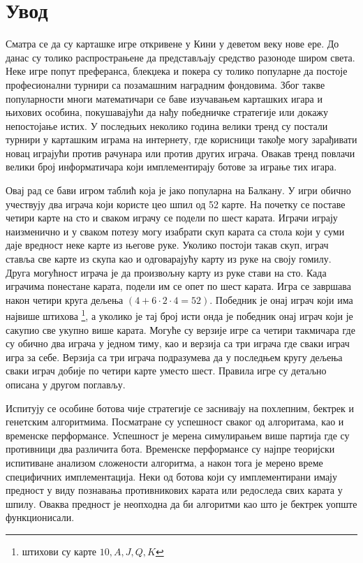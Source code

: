\documentclass[a4paper, 12pt, ngerman]{article}
\let\oldsection\section
\renewcommand\section{\clearpage\oldsection}
\begin{document}
\pagebreak
\tableofcontents
\pagebreak

\section{Увод}
Сматра се да су карташке игре откривене у Кини у деветом веку нове ере. До данас су толико распрострањене да представљају средство разоноде широм света. Неке игре попут преферанса, блекџека и покера су толико популарне да постоје професионални турнири са позамашним наградним фондовима. Због такве популарности многи математичари се баве изучавањем карташких игара и њихових особина, покушавајући да нађу победничке стратегије или докажу непостојање истих. У последњих неколико година велики тренд су постали турнири у карташким играма на интернету, где корисници такође могу зарађивати новац играјући против рачунара или против других играча. Овакав тренд повлачи велики број информатичара који имплементирају ботове за играње тих игара.

Овај рад се бави игром таблић која је јако популарна на Балкану. У игри обично учествују два играча који користе цео шпил од 52 карте. На почетку се поставе четири карте на сто и сваком играчу се подели по шест карата. Играчи играју наизменично и у сваком потезу могу изабрати скуп карата са стола који у суми даје вредност неке карте из његове руке. Уколико постоји такав скуп, играч ставља све карте из скупа као и одговарајућу карту из руке на своју гомилу. Друга могућност играча је да произвољну карту из руке стави на сто. Када играчима понестане карата, подели им се опет по шест карата. Игра се завршава након четири круга дељења $(4 + 6 \cdot 2 \cdot 4 = 52)$. Победник је онај играч који има највише штихова \footnote{штихови су карте $10, A, J, Q, K$}, а уколико је тај број исти онда је победник онај играч који је сакупио све укупно више карата. Могуће су верзије игре са четири такмичара где су обично два играча у једном тиму, као и верзија са три играча где сваки играч игра за себе. Верзија са три играча подразумева да у последњем кругу дељења сваки играч добије по четири карте уместо шест. Правила игре су детаљно описана у другом поглављу.

Испитују се особине ботова чије стратегије се заснивају на похлепним, бектрек и генетским алгоритмима. Посматране су успешност сваког од алгоритама, као и временске перформансе. Успешност је мерена симулирањем више партија где су противници два различита бота. Временске перформансе су најпре теоријски испитиване анализом сложености алгоритма, а након тога је мерено време специфичних имплементација. Неки од ботова који су имплементирани имају предност у виду познавања противникових карата или редоследа свих карата у шпилу. Оваква предност је неопходна да би алгоритми као што је бектрек уопште функционисали.
\end{document}
